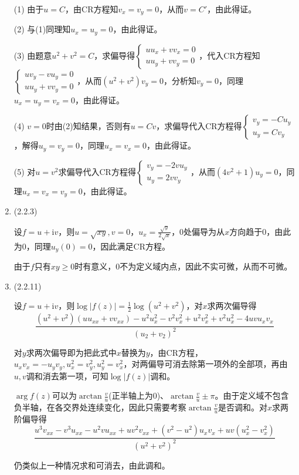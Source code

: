 \documentclass[a4paper,UTF8,fontset=windows]{ctexart}
\begin{document}
\begin{enumerate}
    (1) 由于$u=C$，由CR方程知$v_x=v_y=0$，从而$v=C'$，由此得证。

    (2) 与(1)同理知$u_x=u_y=0$，由此得证。

    (3) 由题意$u^2+v^2=C$，求偏导得$\begin{cases}uu_x+vv_x=0\\uu_y+vv_y=0\end{cases}$，代入CR方程知$\begin{cases}uv_y-vu_y=0\\uu_y+vv_y=0\end{cases}$，从而$(u^2+v^2)v_y=0$，分析知$v_y=0$，同理$u_x=u_y=v_x=0$，由此得证。

    (4) $v=0$时由(2)知结果，否则有$u=Cv$，求偏导代入CR方程得$\begin{cases}v_y=-Cu_y\\u_y=Cv_y\end{cases}$，解得$u_y=v_y=0$，同理$u_x=v_x=0$，由此得证。

    (5) 对$u=v^2$求偏导代入CR方程得$\begin{cases}v_y=-2vu_y\\u_y=2vv_y\end{cases}$，从而$(4v^2+1)u_y=0$，同理$u_x=v_x=v_y=0$，由此得证。

    \item (2.2.3)

    设$f=u+\mathrm{i}v$，则$u=\sqrt{xy},v=0$，$u_x=\frac{\sqrt{y}}{2\sqrt{x}}$，0处偏导为从$x$方向趋于0，由此为0，同理$u_y(0)=0$，因此满足CR方程。

    由于$f$只有$xy\ge0$时有意义，0不为定义域内点，因此不实可微，从而不可微。

    \item (2.2.11)

    设$f=u+\mathrm{i}v$，则$\log|f(z)|=\frac{1}{2}\log(u^2+v^2)$，对$x$求两次偏导得
    \[\frac{(u^2+v^2)(uu_{xx}+vv_{xx})-u^2u_x^2-v^2v_x^2+u^2v_x^2+v^2u_x^2-4uvu_xv_x}{(u_2+v_2)^2}\]

    对$y$求两次偏导即为把此式中$x$替换为$y$，由CR方程，$u_xv_x=-u_yv_y,u_x^2=v_y^2,u_y^2=v_x^2$，对两偏导可消去除第一项外的全部项，再由$u,v$调和消去第一项，可知$\log|f(z)|$调和。

    $\arg f(z)$可以为$\arctan{\frac{v}{u}}$(正半轴上为0)、$\arctan{\frac{v}{u}}\pm\pi$。由于定义域不包含负半轴，在各交界处连续变化，因此只需要考察$\arctan{\frac{v}{u}}$是否调和。对$x$求两阶偏导得
    \[\frac{u^3v_{xx}-v^3u_{xx}-u^2vu_{xx}+uv^2v_{xx}+(v^2-u^2)u_xv_x+uv(u_x^2-v_x^2)}{(u^2+v^2)^2}\]

    仍类似上一种情况求和可消去，由此调和。


\end{enumerate}
\end{document}
